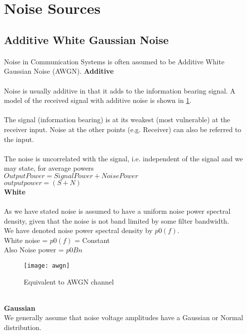 \documentclass[14pt]{report}
\begin{document}
{\section*{Noise Sources}       
\subsection{Additive White Gaussian Noise}
\paragraph{}Noise in Communication Systems is often assumed to be Additive White Gaussian Noise (AWGN).
\textbf{Additive}
\paragraph{}Noise is usually additive in that it adds to the information bearing signal. A model of the received signal with additive noise is shown in \ref{fig:awgn}.

\paragraph{} The signal (information bearing) is at its weakest (most vulnerable) at the receiver input. Noise at the other points (e.g. Receiver) can also be referred to the input.
\paragraph{} The noise is uncorrelated with the signal, i.e. independent of the signal and we may state, for average powers\\
		$Output Power = Signal Power + Noise Power$\\
		$output power = (S+N)$\\
\textbf{White}\\
\paragraph{} As we have stated noise is assumed to have a uniform noise power spectral density, given that the noise is not band limited by some filter bandwidth. \\
 We have denoted noise power spectral density by $p0(f)$.\\
	White noise = $p0(f)$ = Constant \\
	Also Noise power =  $p0Bn$
\begin{figure}[ht]
\centering
\texttt{[image: awgn]}
\label{fig:awgn}
\caption{Equivalent to AWGN channel}
\end{figure}\\
\textbf{Gaussian}\\
We generally assume that noise voltage amplitudes have a Gaussian or Normal distribution.\\

}
\end{document}
